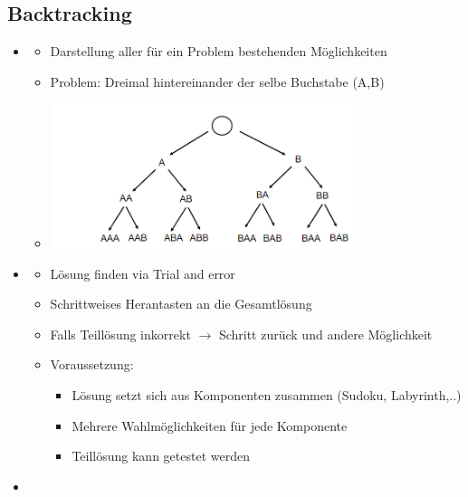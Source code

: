 \documentclass[
    12pt,
    a4paper,
    ngerman,
    color=3b,%
    marginpar=false,
    colorback=false,
    leqno,
]{tudaexercise}
\begin{document}
\subsection{Backtracking}
    \begin{itemize}
        \item {}
            \begin{itemize}
                \item Darstellung aller für ein Problem bestehenden Möglichkeiten
                \item Problem: Dreimal hintereinander der selbe Buchstabe (A,B)
                \item[] \includegraphics[width=9cm]{pictures/suchbaum.PNG}
            \end{itemize}
        \item {}
            \begin{itemize}
                \item Lösung finden via Trial and error
                \item Schrittweises Herantasten an die Gesamtlösung
                \item Falls Teillösung inkorrekt $\rightarrow$ Schritt zurück und andere Möglichkeit
                \item Voraussetzung:
                    \begin{itemize}
                        \item Lösung setzt sich aus Komponenten zusammen (Sudoku, Labyrinth,..)
                        \item Mehrere Wahlmöglichkeiten für jede Komponente
                        \item Teillösung kann getestet werden
                    \end{itemize}
            \end{itemize}
            \item {}
            \begin{itemize}

\end{itemize}
\end{itemize}
\end{document}
